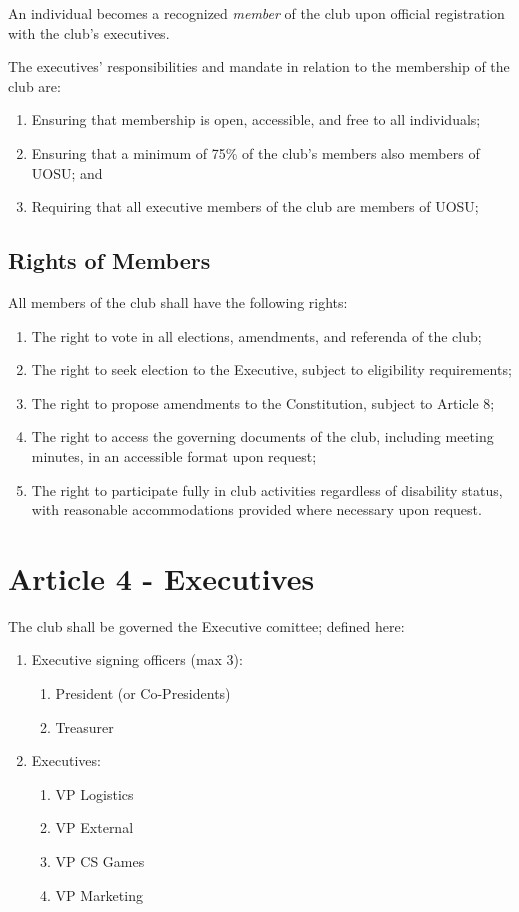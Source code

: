 An individual becomes a recognized \emph{member} of the club upon official registration with the club's executives.

The executives' responsibilities and mandate in relation to the membership of the
club are:
\begin{enumerate}
    \item Ensuring that membership is open, accessible, and free to all individuals;
    \item Ensuring that a minimum of 75\% of the club's members also members of UOSU; and
    \item Requiring that all executive members of the club are members of UOSU;
\end{enumerate}
\subsection*{Rights of Members}
All members of the club shall have the following rights:
\begin{enumerate}
    \item The right to vote in all elections, amendments, and referenda of the club;
    \item The right to seek election to the Executive, subject to eligibility requirements;
    \item The right to propose amendments to the Constitution, subject to Article 8;
    \item The right to access the governing documents of the club, including meeting minutes, in an accessible format upon request;
    \item The right to participate fully in club activities regardless of disability status, with reasonable accommodations provided where necessary upon request.
\end{enumerate}

\section*{Article 4 - Executives}

%  
The club shall be governed the Executive comittee; defined here:
\begin{enumerate}
    \item Executive signing officers (max 3): \begin{enumerate}
        \item President (or Co-Presidents) 
        \item Treasurer
    \end{enumerate}
    \item Executives: \begin{enumerate}
        \item VP Logistics
        \item VP External
        \item VP CS Games
        \item VP Marketing
    \end{enumerate}
\end{enumerate}

